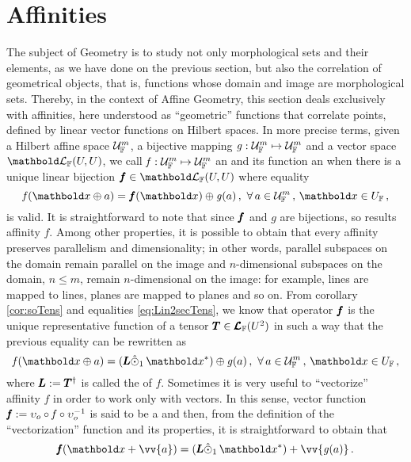 \section{Affinities}\label{sec:aff}
The subject of Geometry is to study not only morphological sets and their elements, as we have done on the previous section, but also the correlation of geometrical objects, that is, functions whose domain and image are morphological sets. Thereby, in the context of Affine Geometry, this section deals exclusively with affinities, here understood as ``geometric'' functions that correlate points, defined by linear vector functions on Hilbert spaces. In more precise terms, given a Hilbert affine space $\eamd{U}{F}{m}$, a bijective mapping $\map{\mathit{g}}{\eamd{U}{F}{m}}{\eamd{U}{F}{m}}$ and a vector space $\evl{\cam{F}}{U}{U}$, we call  $\map{\mathit{f}}{\eamd{U}{F}{m}}{\eamd{U}{F}{m}}$ an  and its function an  when there is a unique linear bijection $\vtf{f}\in\evl{\cam{F}}{U}{U}$ where equality
\begin{equation}\label{eq:affty}
\fua{\mathit{f}}{\vto{x}\oplus a}=\fua{\vtf{f}}{\vto{x}}\oplus\fua{\mathit{g}}{a}\,,\,\,\forall\,a\in\eamd{U}{F}{m}\,,\,\vto{x}\in U_\cam{F}\,,
\end{equation}
is valid. It is straightforward to note that since $\vtf{f}$ and $\mathit{g}$ are bijections, so results affinity $\mathit{f}$. Among other properties, it is possible to obtain that every affinity preserves parallelism and dimensionality; in other words, parallel subspaces on the  domain remain parallel on the image and $n$-dimensional subspaces on the domain, $n\leq m$, remain $n$-dimensional on the image: for example, lines are mapped to lines, planes are mapped to planes and so on. From corollary \ref{cor:soTens} and equalities \eqref{eq:Lin2secTens}, we know that operator $\vtf{f}$ is the unique representative function of a tensor $\tnr{T}\in\ete{\cam{F}}{U^2}$ in such a way that the previous equality can be rewritten as
\begin{equation}\label{eq:afftyT}
\fua{\mathit{f}}{\vto{x}\oplus a}=(\tnr{L}\hat{\odot}_1\,\vto{x}^*)\oplus\fua{\mathit{g}}{a}\,,\,\,\forall\,a\in\eamd{U}{F}{m}\,,\,\vto{x}\in U_\cam{F}\,,
\end{equation}
where $\tnr{L}:=\tnr{T}^\dagger$ is called the  of $\mathit{f}$. Sometimes it is very useful to ``vectorize'' affinity $\mathit{f}$ in order to work only with vectors. In this sense, vector function $\tnr{\mathit{f}}:= \upsilon_o\circ\mathit{f}\circ\upsilon_o^{-1}$ is said to be a  and then, from the definition of the ``vectorization'' function and its properties, it is straightforward to obtain that 
\begin{equation}\label{eq:vecAffi}
\fua{\tnr{\mathit{f}}}{\vto{x}+ \vv{a}}=(\tnr{L}\hat{\odot}_1\,\vto{x}^*)+\vv{\fua{\mathit{g}}{a}}\,.
\end{equation}

